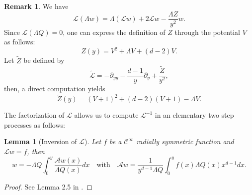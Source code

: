 \documentclass[11pt]{aims}
\newtheorem{lemma}[theorem]{Lemma}
\theoremstyle{definition}
\newtheorem{remark}[theorem]{Remark}
\numberwithin{equation}{section}
\begin{document}
\begin{remark} We have 
\begin{equation}\label{eq:relLsLam}
{\mathscr{L}}(\Lambda w) = \Lambda ({\mathscr{L}} w) + 2 {\mathscr{L}} w - \frac{\Lambda Z}{y^2}w.
\end{equation}
Since ${\mathscr{L}}(\Lambda Q) = 0$, one can express the definition of $Z$ through the potential $V$ as follows: 
\begin{equation}\label{def:ZbyV}
Z(y) = V^2 + \Lambda V + (d-2)V.
\end{equation}
Let $\tilde{Z}$ be defined by 
\begin{equation}\label{def:LstilbyZtil}
\tilde{\mathscr{L}} = -\partial_{yy} - \frac{d-1}{y}{\partial_y} + \frac{\tilde{Z}}{y^2},
\end{equation}
then, a direct computation yields
\begin{equation}\label{def:ZtilbyV}
\tilde{Z}(y) = (V + 1)^2 + (d-2)(V+1) - \Lambda V.
\end{equation}
\end{remark}
The factorization of ${\mathscr{L}}$ allows us to compute ${\mathscr{L}}^{-1}$ in an elementary two step processes as follows:
\begin{lemma}[Inversion of ${\mathscr{L}}$] \label{lemm:inversionL} Let  $f$ be a ${\mathcal{C}}^\infty$ radially symmetric function and ${\mathscr{L}} w = f$, then 
\begin{equation}\label{eq:relaAL}
w = -\Lambda Q\int_0^y\frac{{\mathscr{A}} w(x)}{\Lambda Q(x)}dx \quad \text{with} \quad {\mathscr{A}} w = \frac{1}{y^{d-1}\Lambda Q} \int_0^yf(x) \Lambda Q(x) x^{d-1}dx.
\end{equation}
\end{lemma}
\begin{proof} See Lemma 2.5 in \cite{IGN16}.
\end{proof}
\end{document}
